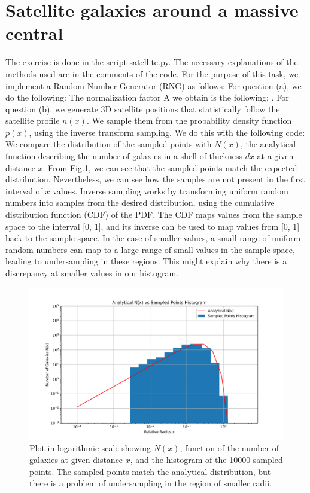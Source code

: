 %
\section{Satellite galaxies around a massive central}
The exercise is done in the script satellite.py. The necessary explanations of the methods used are in the comments of the code. For the purpose of this task, we implement a Random Number Generator (RNG) as follows: 
For question (a), we do the following:  The normalization factor A we obtain is the following: .
For question (b), we generate 3D satellite positions that statistically follow the satellite profile $n(x)$. We sample them from the probability density function $p(x)$, using the inverse transform sampling. We do this with the following code: 
We compare the distribution of the sampled points with $N(x)$, the analytical function describing the number of galaxies in a shell of thickness $dx$ at a given distance $x$. From Fig.\ref{fig:n_vs_hist}, we can see that the sampled points match the expected distribution. Nevertheless, we can see how the samples are not present in the first interval of $x$ values. Inverse sampling works by transforming uniform random numbers into samples from the desired distribution, using the cumulative distribution function (CDF) of the PDF. The CDF maps values from the sample space to the interval [0, 1], and its inverse can be used to map values from [0, 1] back to the sample space. In the case of smaller values, a small range of uniform random numbers can map to a large range of small values in the sample space, leading to undersampling in these regions. This might explain why there is a discrepancy at smaller values in our histogram.

\begin{figure}[h!]
  \centering
  \includegraphics[width=0.9\linewidth]{./plots/my_solution_1b.png}
  \caption{Plot in logarithmic scale showing $N(x)$, function of the number of galaxies at given distance $x$, and the histogram of the 10000 sampled points. The sampled points match the analytical distribution, but there is a problem of undersampling in the region of smaller radii.}
  \label{fig:n_vs_hist}
\end{figure}

